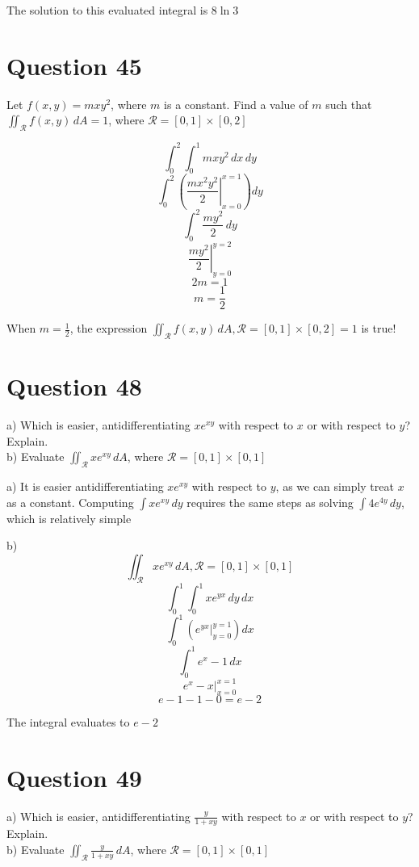 \documentclass[hidelinks]{article}
\begin{document}
The solution to this evaluated integral is $8\ln 3$
\newpage
\section{Question 45}
Let $f(x, y) = mxy^2$, where $m$ is a constant. Find a value of $m$ such that $\iint_{\mathcal{R}} f(x, y) \, dA = 1$, where $\mathcal{R} = [0,1] \times [0,2]$

\[
	\int_0^2 \int_0^1 mxy^2 \,dx\,dy 
\]
\[
	\int_0^2 \left ( \left . \frac{mx^2y^2}{2} \right |_{x = 0}^{x = 1} \right )dy 
\]
\[
	\int_0^2 \frac{my^2}{2}\,dy 
\]
\[
	\left. \frac{my^2}{2} \right |_{y = 0}^{y = 2} 
\]
\[
	2m = 1
\]
\[
	m = \frac{1}{2}
\]

When $m = \frac{1}{2}$, the expression $\iint_{\mathcal{R}} f(x, y) \, dA, \mathcal{R} = [0,1] \times [0,2] = 1$ is true! 

\newpage
\section{Question 48}
a) Which is easier, antidifferentiating $xe^{xy}$ with respect to $x$ or with respect to $y$? Explain.\\
b) Evaluate $\iint_{\mathcal{R}} xe^{xy} \, dA$, where $\mathcal{R} = [0,1] \times [0,1]$

a) It is easier antidifferentiating $xe^{xy}$ with respect to $y$, as we can simply treat $x$ as a constant. Computing $\int xe^{xy} \, dy$ requires the same steps as solving $\int 4e^{4y}\,dy$, which is relatively simple

b)
\[
	\iint_{\mathcal{R}} xe^{xy} \, dA, \mathcal{R} = [0,1] \times [0,1]
\]
\[
	\int_0^1 \int_0^1 xe^{yx} \,dy \, dx
\]
\[
	\int_0^1 \left(e^{yx} \Big |_{y = 0}^{y = 1}\right)dx
\]
\[
	\int_0^1 e^{x} - 1\,dx
\]
\[
	e^x - x \Big |_{x = 0}^{x = 1}
\]
\[
	e - 1 - 1 - 0 = e -2
\]

The integral evaluates to $e-2$


\newpage
\section{Question 49}
a) Which is easier, antidifferentiating $\frac{y}{1+xy}$ with respect to $x$ or with respect to $y$? Explain.\\
b) Evaluate $\iint_{\mathcal{R}} \frac{y}{1+xy} \, dA$, where $\mathcal{R} = [0,1] \times [0,1]$
\end{document}
